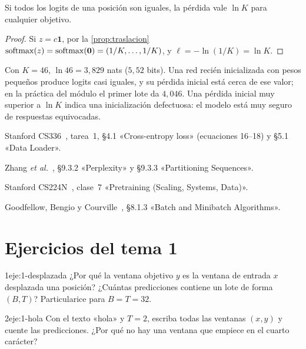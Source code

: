 \begin{proposicion}\label{prop:lnK}
Si todos los logits de una posición son iguales, la pérdida vale $\ln K$ para cualquier objetivo.
\end{proposicion}

\begin{proof}
Si $z=c\mathbf 1$, por la \cref{prop:traslacion} $\operatorname{softmax}(z)=\operatorname{softmax}(\mathbf 0)=(1/K,\dots,1/K)$, y $\ell=-\ln(1/K)=\ln K$.
\end{proof}

Con $K=46$, $\ln 46=3{,}829$ nats ($5{,}52$ bits). Una red recién inicializada con pesos pequeños produce logits casi iguales, y su pérdida inicial está cerca de ese valor; en la práctica del módulo el primer lote da $4{,}046$. Una pérdida inicial muy superior a $\ln K$ indica una inicialización defectuosa: el modelo está muy seguro de respuestas equivocadas.

\begin{lecturas}
\item Stanford CS336~\cite{cs336}, tarea~1, §4.1 «Cross-entropy loss» (ecuaciones 16--18) y §5.1 «Data Loader».
\item Zhang \emph{et al.}~\cite{d2l}, §9.3.2 «Perplexity» y §9.3.3 «Partitioning Sequences».
\item Stanford CS224N~\cite{cs224n}, clase~7 «Pretraining (Scaling, Systems, Data)».
\item Goodfellow, Bengio y Courville~\cite{gbc}, §8.1.3 «Batch and Minibatch Algorithms».
\end{lecturas}

\section*{Ejercicios del tema 1}

\begin{ejercicio}{1}{eje:1-desplazada}
¿Por qué la ventana objetivo $y$ es la ventana de entrada $x$ desplazada una posición? ¿Cuántas predicciones contiene un lote de forma $(B,T)$? Particularice para $B=T=32$.
\end{ejercicio}

\begin{ejercicio}{2}{eje:1-hola}
Con el texto «hola\nl» y $T=2$, escriba todas las ventanas $(x,y)$ y cuente las predicciones. ¿Por qué no hay una ventana que empiece en el cuarto carácter?
\end{ejercicio}

